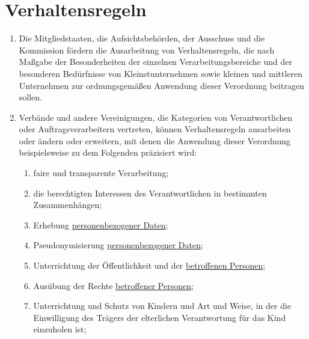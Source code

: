 \chapter{Verhaltensregeln}
\label{ch:40}


\begin{enumerate}

  \item Die Mitgliedstaaten, die Aufsichtsbehörden, der Ausschuss und die Kommission fördern die Ausarbeitung von
   Verhaltensregeln, die nach Maßgabe der Besonderheiten der einzelnen Verarbeitungsbereiche und der besonderen
   Bedürfnisse von Kleinstunternehmen sowie kleinen und mittleren Unternehmen zur ordnungsgemäßen Anwendung dieser
   Verordnung beitragen sollen.
  \label{itm:40-1}

  \item Verbände und andere Vereinigungen, die Kategorien von Verantwortlichen oder Auftragsverarbeitern vertreten,
   können Verhaltensregeln ausarbeiten oder ändern oder erweitern, mit denen die Anwendung dieser Verordnung
   beispielsweise zu dem Folgenden präzisiert wird:
  \label{itm:40-2}

  \begin{enumerate}
  
    \item faire und transparente Verarbeitung;
    \label{itm:40-2a}

    \item die berechtigten Interessen des Verantwortlichen in bestimmten Zusammenhängen;
    \label{itm:40-2b}

    \item Erhebung \hyperref[itm:04-1]{personenbezogener Daten};
    \label{itm:40-2c}

    \item Pseudonymisierung \hyperref[itm:04-1]{personenbezogener Daten};
    \label{itm:40-2d}

    \item Unterrichtung der Öffentlichkeit und der \hyperref[itm:04-1]{betroffenen Personen};
    \label{itm:40-2e}

    \item Ausübung der Rechte \hyperref[itm:04-1]{betroffener Personen};
    \label{itm:40-2f}

    \item Unterrichtung und Schutz von Kindern und Art und Weise, in der die Einwilligung des Trägers der elterlichen
     Verantwortung für das Kind einzuholen ist;
    \label{itm:40-2g}


\end{enumerate}
\end{enumerate}
